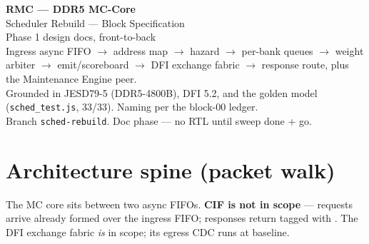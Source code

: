 \documentclass[11pt]{report}
\newcommand{\sig}[1]{\texttt{\detokenize{#1}}}
\begin{document}
\begin{titlepage}
\centering
\vspace*{3cm}
{\Huge\bfseries RMC --- DDR5 MC-Core}\\[6pt]
{\LARGE Scheduler Rebuild --- Block Specification}\\[18pt]
{\large Phase 1 design docs, front-to-back}\\[8pt]
{\normalsize Ingress async FIFO $\to$ address map $\to$ hazard $\to$ per-bank queues $\to$
weight arbiter $\to$ emit/scoreboard $\to$ DFI exchange fabric $\to$ response route,
plus the Maintenance Engine peer.}\\[24pt]
{\footnotesize Grounded in JESD79-5 (DDR5-4800B), DFI 5.2, and the golden model
(\texttt{sched\_test.js}, 33/33). Naming per the block-00 ledger.}\\[4pt]
{\footnotesize Branch \texttt{sched-rebuild}. Doc phase --- no RTL until sweep done + go.}
\vfill
\end{titlepage}

\tableofcontents
\clearpage

\chapter{Architecture spine (packet walk)}

The MC core sits between two async FIFOs. \textbf{CIF is not in scope} --- requests arrive
already formed over the ingress FIFO; responses return tagged with \sig{id}. The DFI
exchange fabric \emph{is} in scope; its egress CDC runs at \sig{mc_clk} baseline.

\begin{center}
\end{center}
\end{document}
